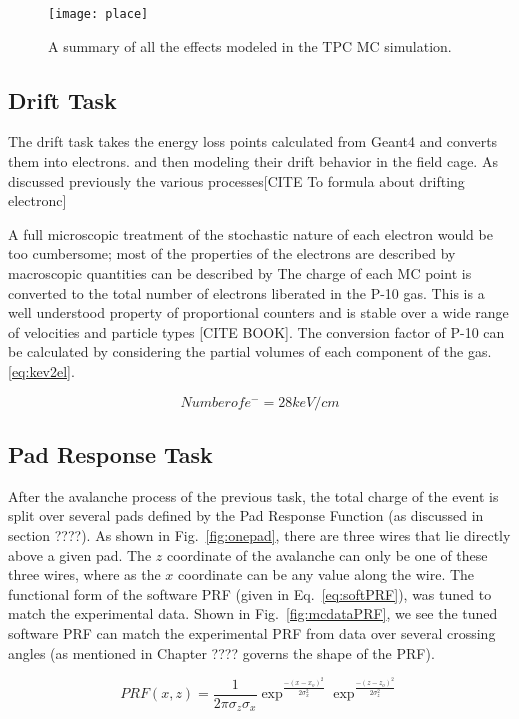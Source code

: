 \begin{figure}
\texttt{[image: place]}
\caption{A summary of all the effects modeled in the TPC MC simulation.}
\label{fig:place}
\end{figure}

\subsection{Drift Task}
The drift task takes the energy loss points calculated from Geant4 and converts them into electrons.  and then modeling their drift behavior in the field cage. As discussed previously the various processes[CITE To formula about drifting electronc]


 A full microscopic treatment of the stochastic nature of each electron would be too cumbersome; most of the properties of the electrons are described by macroscopic quantities can be described by 
The charge of each MC point is converted to the total number of electrons liberated in the P-10 gas. This is a well understood property of proportional counters and is stable over a wide range of velocities and particle types [CITE BOOK]. The conversion factor of P-10 can be calculated by considering the partial volumes of each component of the gas.  \ref{eq:kev2el}.

\begin{equation}
Number of e^{-} = 28 keV/cm
\label{eq:kev2el}
\end{equation}

\subsection{Pad Response Task}
After the avalanche process of the previous task, the total charge of the event is split over several pads defined by the Pad Response Function (as discussed in section ????). As shown in Fig.~\ref{fig:onepad}, there are three wires that lie directly above a given pad. The $z$ coordinate of the avalanche can only be one of these three wires, where as the $x$ coordinate can be any value along the wire. The functional form of the software PRF (given in Eq.~\ref{eq:softPRF}), was tuned to match the experimental data. Shown in Fig.~\ref{fig:mcdataPRF}, we see the tuned software PRF can match the experimental PRF from data over several crossing angles (as mentioned in Chapter ???? governs the shape of the PRF). 

\begin{equation}
PRF(x,z) = \frac{1}{2\pi\sigma_z\sigma_x}\exp^{\frac{-{(x-x_o)}^2}{2\sigma_x^2}}\exp^{\frac{-{(z-z_o)}^2}{2\sigma_z^2}}
\label{eq:softPRF}
\end{equation}

